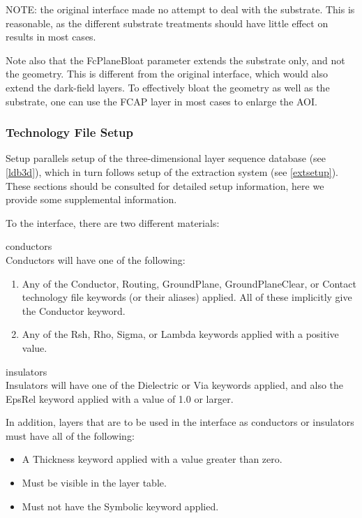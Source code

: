 NOTE:  the original interface made no attempt to deal with the
substrate.  This is reasonable, as the different substrate treatments
should have little effect on results in most cases.

Note also that the {\et FcPlaneBloat} parameter extends the substrate
only, and not the geometry.  This is different from the original
interface, which would also extend the dark-field layers.  To
effectively bloat the geometry as well as the substrate, one can use
the {\vt FCAP} layer in most cases to enlarge the AOI.

\subsubsection{Technology File Setup}

Setup parallels setup of the three-dimensional layer sequence database
(see \ref{ldb3d}), which in turn follows setup of the extraction
system (see \ref{extsetup}).  These sections should be consulted for
detailed setup information, here we provide some supplemental
information.

To the interface, there are two different materials:
\begin{description}
\item{conductors}\\
Conductors will have one of the following:
\begin{enumerate}
\item{Any of the {\vt Conductor}, {\vt Routing}, {\vt GroundPlane},
{\vt GroundPlaneClear}, or {\vt Contact} technology file keywords (or
their aliases) applied.  All of these implicitly give the {\et
Conductor} keyword.}

\item{Any of the {\et Rsh}, {\et Rho}, {\et Sigma}, or {\et Lambda}
keywords applied with a positive value.}
\end{enumerate}

\item{insulators}\\
Insulators will have one of the {\et Dielectric} or {\et Via} keywords
applied, and also the {\et EpsRel} keyword applied with a value of 1.0
or larger.
\end{description}

In addition, layers that are to be used in the interface as conductors
or insulators must have all of the following:

\begin{itemize}
\item{A {\et Thickness} keyword applied with a value greater than
zero.}

\item{Must be visible in the layer table.}

\item{Must not have the {\et Symbolic} keyword applied.}
\end{itemize}

